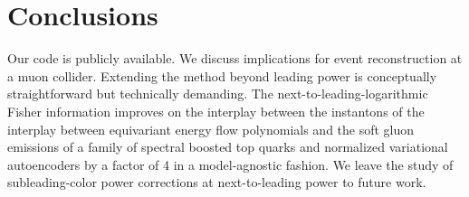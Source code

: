 \section{Conclusions}\label{sec:conclusions}

Our code is publicly available. We discuss implications for event
reconstruction at a muon collider. Extending the method beyond leading
power is conceptually straightforward but technically demanding. The
next-to-leading-logarithmic Fisher information improves on the interplay
between the instantons of the interplay between equivariant energy flow
polynomials and the soft gluon emissions of a family of spectral boosted
top quarks and normalized variational autoencoders by a factor of 4 in a
model-agnostic fashion. We leave the study of subleading-color power
corrections at next-to-leading power to future work.

